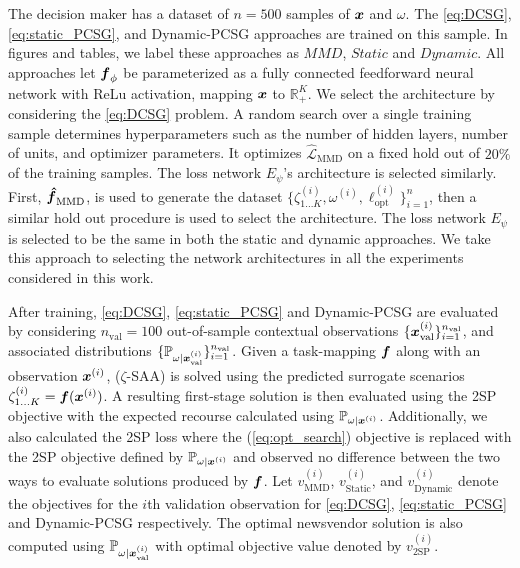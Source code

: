 The decision maker has a dataset of $n = 500$ samples of $\boldsymbol{x}$ and $\omega$. The \ref{eq:DCSG}, \ref{eq:static_PCSG}, and Dynamic-PCSG approaches are trained on this sample. In figures and tables, we label these approaches as $\textit{MMD}$, $\textit{Static}$ and $\textit{Dynamic}$. All approaches let $\boldsymbol{f}_{\phi}$ be parameterized as a fully connected feedforward neural network with ReLu activation, mapping $\boldsymbol{x}$ to $\mathbb{R}_{+}^K$. We select the architecture by considering the \ref{eq:DCSG} problem. A random search over a single training sample determines hyperparameters such as the number of hidden layers, number of units, and optimizer parameters. It optimizes $\mathcal{\hat{L}}_{\text{MMD}}$ on a fixed hold out of $20\%$ of the training samples. The loss network $E_{\psi}$'s architecture is selected similarly. First, $\boldsymbol{\hat{f}}_{\text{MMD}}$, is used to generate the dataset $\{\zeta_{1...K}^{(i)}, \omega^{(i)}, \ell^{(i)}_{\text{opt}} \}_{i=1}^n$, then a similar hold out procedure is used to select the architecture. The loss network $E_{\psi}$ is selected to be the same in both the static and dynamic approaches. We take this approach to selecting the network architectures in all the experiments considered in this work.

After training,  \ref{eq:DCSG}, \ref{eq:static_PCSG} and Dynamic-PCSG are evaluated by considering $n_{\text{val}} = 100$ out-of-sample contextual observations $\{ \boldsymbol{x}^{(i)}_{\text{val}} \}_{i=1}^{n_{\text{val}}}$, and associated distributions {\small $\{\mathbb{P}_{\omega| \boldsymbol{x}^{(i)}_{\text{val}} } \}_{i=1}^{n_{\text{val}}}$}. Given a task-mapping $\boldsymbol{f}$ along with an observation $\boldsymbol{x}^{(i)}$, ($\zeta$-SAA) is solved using the predicted surrogate scenarios $\zeta_{1...K}^{(i)} = \boldsymbol{f}(\boldsymbol{x}^{(i)})$. A resulting first-stage solution is then evaluated using the 2SP objective with the expected recourse calculated using $\mathbb{P}_{\omega | \boldsymbol{x}^{(i)}}$. Additionally, we also calculated the 2SP loss where the (\ref{eq:opt_search}) objective is replaced with the 2SP objective defined by $\mathbb{P}_{\omega | \boldsymbol{x}^{(i)}}$ and observed no difference between the two ways to evaluate solutions produced by $\boldsymbol{f}$. Let $v_{\text{MMD}}^{(i)}$, $v_{\text{Static}}^{(i)}$, and $v_{\text{Dynamic}}^{(i)}$ denote the objectives for the $i$th validation observation for \ref{eq:DCSG}, \ref{eq:static_PCSG} and Dynamic-PCSG respectively. The optimal newsvendor solution is also computed using $\mathbb{P}_{\omega | \boldsymbol{x}^{(i)}_{\text{val}}}$ with optimal objective value denoted by $v_{\text{2SP}}^{(i)}$.

